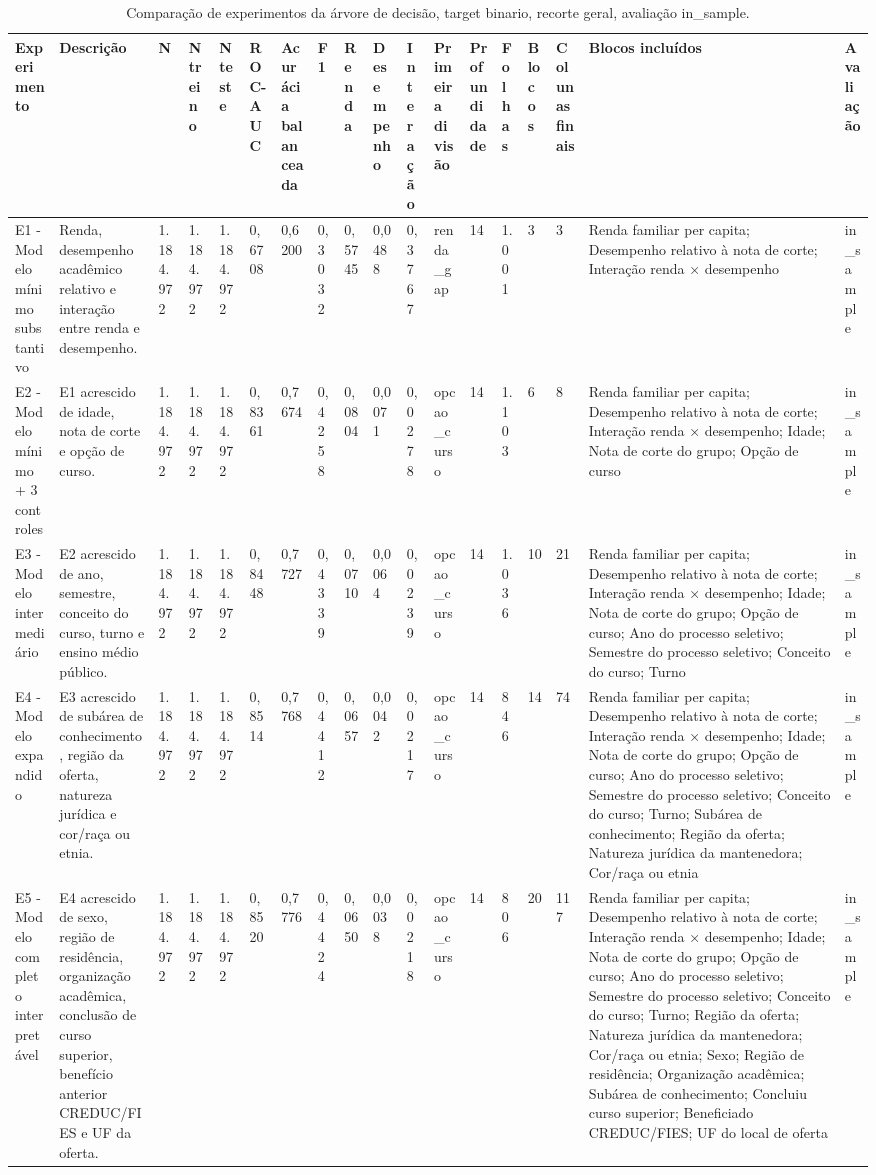 \begin{table}
\caption{Comparação de experimentos da árvore de decisão, target binario, recorte geral, avaliação in_sample.}
\label{tab:tabela_treeClassification_14_profundidade_binario_recorte_geral_in_sample}
\begin{tabular}{llllllllllllllllll}
\toprule
Experimento & Descrição & N & N treino & N teste & ROC-AUC & Acurácia balanceada & F1 & Renda & Desempenho & Interação & Primeira divisão & Profundidade & Folhas & Blocos & Colunas finais & Blocos incluídos & Avaliação \\
\midrule
E1 - Modelo mínimo substantivo & Renda, desempenho acadêmico relativo e interação entre renda e desempenho. & 1.184.972 & 1.184.972 & 1.184.972 & 0,6708 & 0,6200 & 0,3032 & 0,5745 & 0,0488 & 0,3767 & renda\_gap & 14 & 1.001 & 3 & 3 & Renda familiar per capita; Desempenho relativo à nota de corte; Interação renda × desempenho & in\_sample \\
E2 - Modelo mínimo + 3 controles & E1 acrescido de idade, nota de corte e opção de curso. & 1.184.972 & 1.184.972 & 1.184.972 & 0,8361 & 0,7674 & 0,4258 & 0,0804 & 0,0071 & 0,0278 & opcao\_curso & 14 & 1.103 & 6 & 8 & Renda familiar per capita; Desempenho relativo à nota de corte; Interação renda × desempenho; Idade; Nota de corte do grupo; Opção de curso & in\_sample \\
E3 - Modelo intermediário & E2 acrescido de ano, semestre, conceito do curso, turno e ensino médio público. & 1.184.972 & 1.184.972 & 1.184.972 & 0,8448 & 0,7727 & 0,4339 & 0,0710 & 0,0064 & 0,0239 & opcao\_curso & 14 & 1.036 & 10 & 21 & Renda familiar per capita; Desempenho relativo à nota de corte; Interação renda × desempenho; Idade; Nota de corte do grupo; Opção de curso; Ano do processo seletivo; Semestre do processo seletivo; Conceito do curso; Turno & in\_sample \\
E4 - Modelo expandido & E3 acrescido de subárea de conhecimento, região da oferta, natureza jurídica e cor/raça ou etnia. & 1.184.972 & 1.184.972 & 1.184.972 & 0,8514 & 0,7768 & 0,4412 & 0,0657 & 0,0042 & 0,0217 & opcao\_curso & 14 & 846 & 14 & 74 & Renda familiar per capita; Desempenho relativo à nota de corte; Interação renda × desempenho; Idade; Nota de corte do grupo; Opção de curso; Ano do processo seletivo; Semestre do processo seletivo; Conceito do curso; Turno; Subárea de conhecimento; Região da oferta; Natureza jurídica da mantenedora; Cor/raça ou etnia & in\_sample \\
E5 - Modelo completo interpretável & E4 acrescido de sexo, região de residência, organização acadêmica, conclusão de curso superior, benefício anterior CREDUC/FIES e UF da oferta. & 1.184.972 & 1.184.972 & 1.184.972 & 0,8520 & 0,7776 & 0,4424 & 0,0650 & 0,0038 & 0,0218 & opcao\_curso & 14 & 806 & 20 & 117 & Renda familiar per capita; Desempenho relativo à nota de corte; Interação renda × desempenho; Idade; Nota de corte do grupo; Opção de curso; Ano do processo seletivo; Semestre do processo seletivo; Conceito do curso; Turno; Região da oferta; Natureza jurídica da mantenedora; Cor/raça ou etnia; Sexo; Região de residência; Organização acadêmica; Subárea de conhecimento; Concluiu curso superior; Beneficiado CREDUC/FIES; UF do local de oferta & in\_sample \\

\end{tabular}
\end{table}
